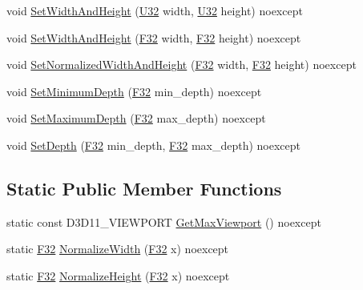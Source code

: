 \begin{DoxyCompactItemize}
\item 
void \hyperlink{structmage_1_1_viewport_ab3b8cdbc0b6b6e1c34bab0a4f05e0d52}{Set\+Width\+And\+Height} (\hyperlink{namespacemage_a41c104c036fba3756a74e19f793eeaa1}{U32} width, \hyperlink{namespacemage_a41c104c036fba3756a74e19f793eeaa1}{U32} height) noexcept
\item 
void \hyperlink{structmage_1_1_viewport_ab45df0ab7757f95d825fd724db663af5}{Set\+Width\+And\+Height} (\hyperlink{namespacemage_aa97e833b45f06d60a0a9c4fc22ae02c0}{F32} width, \hyperlink{namespacemage_aa97e833b45f06d60a0a9c4fc22ae02c0}{F32} height) noexcept
\item 
void \hyperlink{structmage_1_1_viewport_ae456cd1a570d41bff6939d29722fa8ca}{Set\+Normalized\+Width\+And\+Height} (\hyperlink{namespacemage_aa97e833b45f06d60a0a9c4fc22ae02c0}{F32} width, \hyperlink{namespacemage_aa97e833b45f06d60a0a9c4fc22ae02c0}{F32} height) noexcept
\item 
void \hyperlink{structmage_1_1_viewport_a7e5ea28ca50be25d48668bd8ce4995d5}{Set\+Minimum\+Depth} (\hyperlink{namespacemage_aa97e833b45f06d60a0a9c4fc22ae02c0}{F32} min\+\_\+depth) noexcept
\item 
void \hyperlink{structmage_1_1_viewport_a5f3d52bcaeaa3048d4da86e363131455}{Set\+Maximum\+Depth} (\hyperlink{namespacemage_aa97e833b45f06d60a0a9c4fc22ae02c0}{F32} max\+\_\+depth) noexcept
\item 
void \hyperlink{structmage_1_1_viewport_a15a328f7feb3f17dc1c9af47f30dce3b}{Set\+Depth} (\hyperlink{namespacemage_aa97e833b45f06d60a0a9c4fc22ae02c0}{F32} min\+\_\+depth, \hyperlink{namespacemage_aa97e833b45f06d60a0a9c4fc22ae02c0}{F32} max\+\_\+depth) noexcept
\end{DoxyCompactItemize}
\subsection*{Static Public Member Functions}
\begin{DoxyCompactItemize}
\item 
static const D3\+D11\+\_\+\+V\+I\+E\+W\+P\+O\+RT \hyperlink{structmage_1_1_viewport_aec4a434cbb6f68805d02f1be6ecbf5a8}{Get\+Max\+Viewport} () noexcept
\item 
static \hyperlink{namespacemage_aa97e833b45f06d60a0a9c4fc22ae02c0}{F32} \hyperlink{structmage_1_1_viewport_a2c00b7da56962f96830fd7626ef85d04}{Normalize\+Width} (\hyperlink{namespacemage_aa97e833b45f06d60a0a9c4fc22ae02c0}{F32} x) noexcept
\item 
static \hyperlink{namespacemage_aa97e833b45f06d60a0a9c4fc22ae02c0}{F32} \hyperlink{structmage_1_1_viewport_a7e8becd79a69371d7f6d513c88b04a5a}{Normalize\+Height} (\hyperlink{namespacemage_aa97e833b45f06d60a0a9c4fc22ae02c0}{F32} x) noexcept
\end{DoxyCompactItemize}
